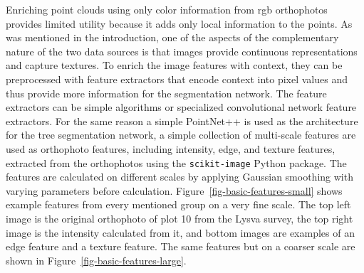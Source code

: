 Enriching point clouds using only color information from \gls{rgb} orthophotos provides limited utility because it adds only local information to the points.
As was mentioned in the introduction, one of the aspects of the complementary nature of the two data sources is that images provide continuous representations and capture textures.
To enrich the image features with context, they can be preprocessed with feature extractors that encode context into pixel values and thus provide more information for the segmentation network.
The feature extractors can be simple algorithms or specialized convolutional network feature extractors.
For the same reason a simple PointNet++ is used as the architecture for the tree segmentation network, a simple collection of multi-scale features are used as orthophoto features, including intensity, edge, and texture features, extracted from the orthophotos using the \texttt{scikit-image} Python package.
The features are calculated on different scales by applying Gaussian smoothing with varying parameters before calculation.
Figure~\ref{fig-basic-features-small} shows example features from every mentioned group on a very fine scale.
The top left image is the original orthophoto of plot 10 from the Lysva survey, the top right image is the intensity calculated from it, and bottom images are examples of an edge feature and a texture feature.
The same features but on a coarser scale are shown in Figure~\ref{fig-basic-features-large}.

